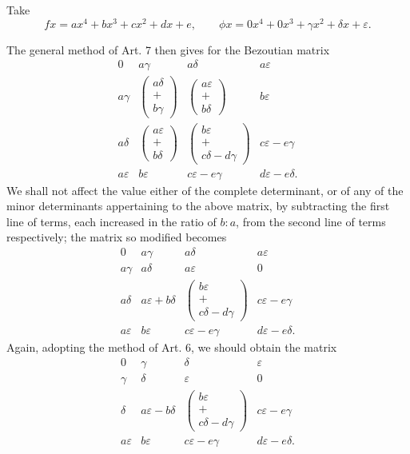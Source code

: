 \documentclass[11pt]{article}
\newcommand{\sourcepage}[1]{\marginpar{\scriptsize p.~#1}}
\begin{document}
Take
\[
fx=ax^4+bx^3+cx^2+dx+e,
\qquad
\phi x=0x^4+0x^3+\gamma x^2+\delta x+\varepsilon.
\]

\sourcepage{450}
The general method of Art. 7 then gives for the Bezoutian matrix
\[
\begin{array}{cccc}
0&a\gamma&a\delta&a\varepsilon\\
a\gamma&\left(\begin{array}{c}a\delta\\+\\b\gamma\end{array}\right)&
\left(\begin{array}{c}a\varepsilon\\+\\b\delta\end{array}\right)&b\varepsilon\\
a\delta&\left(\begin{array}{c}a\varepsilon\\+\\b\delta\end{array}\right)&
\left(\begin{array}{c}b\varepsilon\\+\\c\delta-d\gamma\end{array}\right)&c\varepsilon-e\gamma\\
a\varepsilon&b\varepsilon&c\varepsilon-e\gamma&d\varepsilon-e\delta.
\end{array}
\]
We shall not affect the value either of the complete determinant, or of any of the minor determinants appertaining to the above matrix, by subtracting the first line of terms, each increased in the ratio of $b:a$, from the second line of terms respectively; the matrix so modified becomes
\[
\begin{array}{cccc}
0&a\gamma&a\delta&a\varepsilon\\
a\gamma&a\delta&a\varepsilon&0\\
a\delta&a\varepsilon+b\delta&\left(\begin{array}{c}b\varepsilon\\+\\c\delta-d\gamma\end{array}\right)&c\varepsilon-e\gamma\\
a\varepsilon&b\varepsilon&c\varepsilon-e\gamma&d\varepsilon-e\delta.
\end{array}
\]
Again, adopting the method of Art. 6, we should obtain the matrix
\[
\begin{array}{cccc}
0&\gamma&\delta&\varepsilon\\
\gamma&\delta&\varepsilon&0\\
\delta&a\varepsilon-b\delta&\left(\begin{array}{c}b\varepsilon\\+\\c\delta-d\gamma\end{array}\right)&c\varepsilon-e\gamma\\
a\varepsilon&b\varepsilon&c\varepsilon-e\gamma&d\varepsilon-e\delta.
\end{array}
\]
\end{document}

